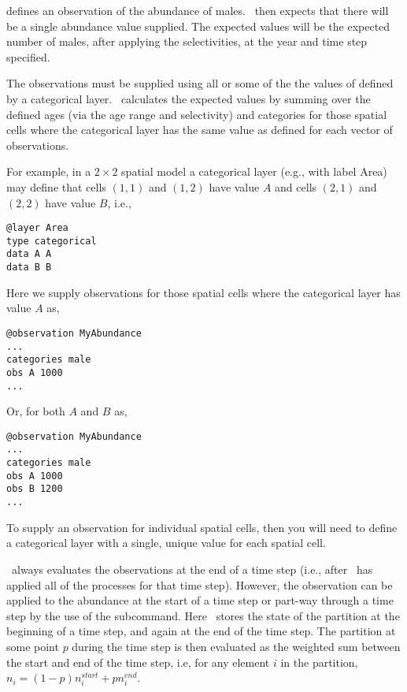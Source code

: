 defines an observation of the abundance of males. \SPM\ then expects that there will be a single abundance value supplied. The expected values will be the expected number of males, after applying the selectivities, at the year and time step specified. 

The observations must be supplied using all or some of the the values of defined by a categorical layer. \SPM\ calculates the expected values by summing over the defined ages (via the age range and selectivity) and categories for those spatial cells where the categorical layer has the same value as defined for each vector of observations.

For example, in a $2 \times 2$ spatial model a categorical layer (e.g., with label Area) may define that cells $(1,1)$ and $(1,2)$ have value $A$ and cells $(2,1)$ and $(2,2)$ have value $B$, i.e.,

\begin{verbatim}
@layer Area
type categorical
data A A 
data B B
\end{verbatim}

Here we supply observations for those spatial cells where the categorical layer has value $A$ as, 

\begin{verbatim}
@observation MyAbundance
...
categories male 
obs A 1000
...
\end{verbatim}

Or, for both $A$ and $B$ as,

\begin{verbatim}
@observation MyAbundance
...
categories male
obs A 1000
obs B 1200
...
\end{verbatim}

To supply an observation for individual spatial cells, then you will need to define a categorical layer with a single, unique value for each spatial cell. 

\SPM\ always evaluates the observations at the end of a time step (i.e., after \SPM\ has applied all of the processes for that time step). However, the observation can be applied to the abundance at the start of a time step or part-way through a time step by the use of the  subcommand. Here \SPM\ stores the state of the partition at the beginning of a time step, and again at the end of the time step. The partition at some point $p$ during the time step is then evaluated as the weighted sum between the start and end of the time step, i.e, for any element $i$ in the partition, $n_i=(1-p) n_i^{start} + p n_i^{end}$.

